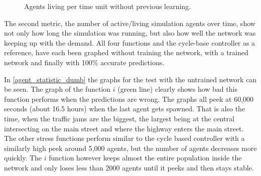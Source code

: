 \begin{figure}[hb!]
	\centering
	\label{agent_statistic_dumb}
	\caption{Agents living per time unit without previous learning.}
\end{figure}

The second metric, the number of active/living simulation agents over time, show not only how long the simulation was running, but also how well the network was keeping up with the demand. All four functions and the cycle-base controller as a reference, have each been graphed without training the network, with a trained network and finally with 100\% accurate predictions.

In \autoref{agent_statistic_dumb} the graphs for the test with the untrained network can be seen. The graph of the function $i$ (green line) clearly shows how bad this function performs when the predictions are wrong. The graphs all peek at 60,000 seconds (about 16.5 hours) when the last agent gets spawned. That is also the time, when the traffic jams are the biggest, the largest being at the central intersecting on the main street and where the highway enters the main street. The other stress functions perform similar to the cycle based controller with a similarly high peek around 5,000 agents, but the number of agents decreases more quickly. The $i$ function however keeps almost the entire population inside the network and only loses less than 2000 agents until it peeks and then stays stable.

